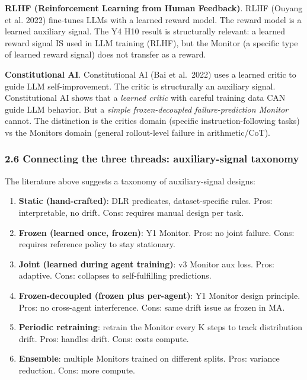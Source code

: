 \documentclass[
]{article}
\providecommand{\tightlist}{%
  \setlength{\itemsep}{0pt}\setlength{\parskip}{0pt}}
\begin{document}
\textbf{RLHF (Reinforcement Learning from Human Feedback)}. RLHF (Ouyang
et al. 2022) fine-tunes LLMs with a learned reward model. The reward
model is a learned auxiliary signal. The Y4 H10 result is structurally
relevant: a learned reward signal IS used in LLM training (RLHF), but
the Monitor (a specific type of learned reward signal) does not transfer
as a reward.

\textbf{Constitutional AI}. Constitutional AI (Bai et al.~2022) uses a
learned critic to guide LLM self-improvement. The critic is structurally
an auxiliary signal. Constitutional AI shows that a \emph{learned
critic} with careful training data CAN guide LLM behavior. But a
\emph{simple frozen-decoupled failure-prediction Monitor} cannot. The
distinction is the critics domain (specific instruction-following tasks)
vs the Monitors domain (general rollout-level failure in
arithmetic/CoT).

\subsubsection{2.6 Connecting the three threads: auxiliary-signal
taxonomy}\label{connecting-the-three-threads-auxiliary-signal-taxonomy}

The literature above suggests a taxonomy of auxiliary-signal designs:

\begin{enumerate}
\def\labelenumi{\arabic{enumi}.}
\tightlist
\item
  \textbf{Static (hand-crafted)}: DLR predicates, dataset-specific
  rules. Pros: interpretable, no drift. Cons: requires manual design per
  task.
\item
  \textbf{Frozen (learned once, frozen)}: Y1 Monitor. Pros: no joint
  failure. Cons: requires reference policy to stay stationary.
\item
  \textbf{Joint (learned during agent training)}: v3 Monitor aux loss.
  Pros: adaptive. Cons: collapses to self-fulfilling predictions.
\item
  \textbf{Frozen-decoupled (frozen plus per-agent)}: Y1 Monitor design
  principle. Pros: no cross-agent interference. Cons: same drift issue
  as frozen in MA.
\item
  \textbf{Periodic retraining}: retrain the Monitor every K steps to
  track distribution drift. Pros: handles drift. Cons: costs compute.
\item
  \textbf{Ensemble}: multiple Monitors trained on different splits.
  Pros: variance reduction. Cons: more compute.
\end{enumerate}
\end{document}
